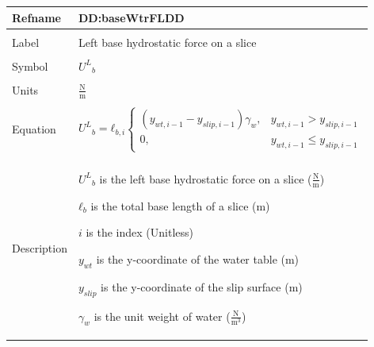 \documentclass[12pt]{article}
\begin{document}
\noindent \begin{minipage}{\textwidth}
\begin{tabular}{p{} p{}}
\toprule \textbf{Refname} & \textbf{DD:baseWtrFLDD}
\label{DD:baseWtrFLDD}
\\ \midrule \\
Label & Left base hydrostatic force on a slice
        \\ \midrule \\
        Symbol & ${{U^{L}}_{b}}$
                 \\ \midrule \\
                 Units & $\frac{\text{N}}{\text{m}}$
                         \\ \midrule \\
                         Equation & \begin{displaymath}
                                    {{U^{L}}_{b}}={ℓ_{b,i}} \begin{cases}
\left({y_{wt,i-1}}-{y_{slip,i-1}}\right) {γ_{w}}, & {y_{wt,i-1}}>{y_{slip,i-1}}\\
0, & {y_{wt,i-1}}\leq{}{y_{slip,i-1}}
\end{cases}
                                    \end{displaymath}
                                    \\ \midrule \\
                                    Description & \begin{symbDescription}
                                                  \item{${{U^{L}}_{b}}$ is the left base hydrostatic force on a slice ($\frac{\text{N}}{\text{m}}$)}
                                                  \item{${ℓ_{b}}$ is the total base length of a slice (m)}
                                                  \item{$i$ is the index (Unitless)}
                                                  \item{${y_{wt}}$ is the y-coordinate of the water table (m)}
                                                  \item{${y_{slip}}$ is the y-coordinate of the slip surface (m)}
                                                  \item{${γ_{w}}$ is the unit weight of water ($\frac{\text{N}}{\text{m}^{3}}$)}
                                                  \end{symbDescription}

\end{tabular}
\end{minipage}
\end{document}
